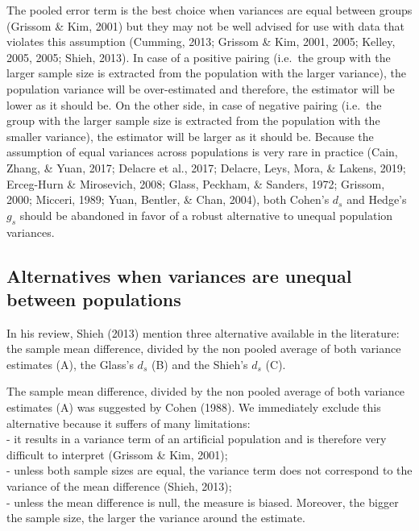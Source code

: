 \documentclass[
  man,floatsintext]{apa6}
\begin{document}
The pooled error term is the best choice when variances are equal between groups (Grissom \& Kim, 2001) but they may not be well advised for use with data that violates this assumption (Cumming, 2013; Grissom \& Kim, 2001, 2005; Kelley, 2005, 2005; Shieh, 2013). In case of a positive pairing (i.e.~the group with the larger sample size is extracted from the population with the larger variance), the population variance will be over-estimated and therefore, the estimator will be lower as it should be. On the other side, in case of negative pairing (i.e.~the group with the larger sample size is extracted from the population with the smaller variance), the estimator will be larger as it should be. Because the assumption of equal variances across populations is very rare in practice (Cain, Zhang, \& Yuan, 2017; Delacre et al., 2017; Delacre, Leys, Mora, \& Lakens, 2019; Erceg-Hurn \& Mirosevich, 2008; Glass, Peckham, \& Sanders, 1972; Grissom, 2000; Micceri, 1989; Yuan, Bentler, \& Chan, 2004), both Cohen's \(d_s\) and Hedge's \(g_s\) should be abandoned in favor of a robust alternative to unequal population variances.

\hypertarget{alternatives-when-variances-are-unequal-between-populations}{%
\subsection{Alternatives when variances are unequal between populations}\label{alternatives-when-variances-are-unequal-between-populations}}

In his review, Shieh (2013) mention three alternative available in the literature: the sample mean difference, divided by the non pooled average of both variance estimates (A), the Glass's \(d_s\) (B) and the Shieh's \(d_s\) (C).

The sample mean difference, divided by the non pooled average of both variance estimates (A) was suggested by Cohen (1988). We immediately exclude this alternative because it suffers of many limitations:\\
- it results in a variance term of an artificial population and is therefore very difficult to interpret (Grissom \& Kim, 2001);\\
- unless both sample sizes are equal, the variance term does not correspond to the variance of the mean difference (Shieh, 2013);\\
- unless the mean difference is null, the measure is biased. Moreover, the bigger the sample size, the larger the variance around the estimate.
\end{document}
